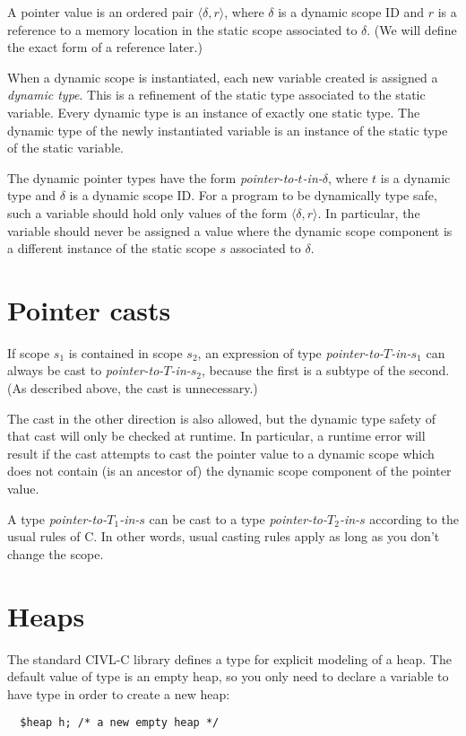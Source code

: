 A pointer value is an ordered pair $\langle \delta,r \rangle$, where
$\delta$ is a dynamic scope ID and $r$ is a reference to a memory
location in the static scope associated to $\delta$.  (We will define
the exact form of a reference later.)

When a dynamic scope is instantiated, each new variable created is
assigned a \emph{dynamic type}.  This is a refinement of the static
type associated to the static variable.   Every dynamic type
is an instance of exactly one static type.  The dynamic
type of the newly instantiated variable is an instance of the
static type of the static variable.

The dynamic pointer types have the form
\emph{pointer-to-$t$-in-$\delta$}, where $t$ is a dynamic type and
$\delta$ is a dynamic scope ID.  For a program to be dynamically type
safe, such a variable should hold only values of the form $\langle
\delta, r\rangle$.  In particular, the variable should never be
assigned a value where the dynamic scope component is a different
instance of the static scope $s$ associated to $\delta$.

\section{Pointer casts}

If scope $s_1$ is contained in scope $s_2$, an expression of type
\emph{pointer-to-$T$-in-$s_1$} can always be cast to
\emph{pointer-to-$T$-in-$s_2$},
 because the first is a subtype of the second.  (As described above,
the cast is unnecessary.)  

The cast in the other direction is also allowed, but the dynamic type
safety of that cast will only be checked at runtime.  In particular, a
runtime error will result if the cast attempts to cast the pointer
value to a dynamic scope which does not contain (is an ancestor of)
the dynamic scope component of the pointer value.

A type \emph{pointer-to-$T_1$-in-$s$} can be cast to a type
\emph{pointer-to-$T_2$-in-$s$} according to the usual rules of C.  In
other words, usual casting rules apply as long as you don't change the
scope.



\section{Heaps}

The standard CIVL-C library defines a type \cheap{} for explicit
modeling of a heap.  The default value of \cheap{} type is an empty
heap, so you only need to declare a variable to have type \cheap{}
in order to create a new heap:
\begin{verbatim}
  $heap h; /* a new empty heap */
\end{verbatim}

